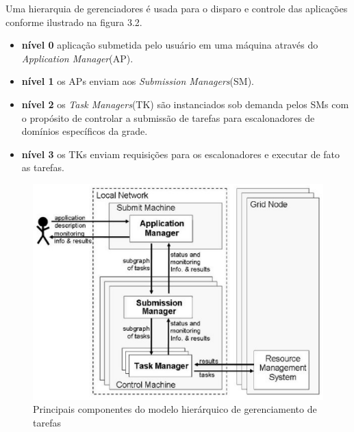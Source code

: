 Uma hierarquia de gerenciadores é usada para o disparo e controle das aplicações conforme ilustrado na figura 3.2.

\begin{itemize}
	\item \textbf{nível 0} aplicação submetida pelo usuário em uma máquina através do \emph{Application Manager}(AP).
	\item \textbf{nível 1} os APs enviam aos \emph{Submission Managers}(SM).
	\item \textbf{nível 2} os \emph{Task Managers}(TK) são instanciados sob demanda pelos SMs com o propósito de controlar a submissão de tarefas para escalonadores de domínios específicos da grade.
	\item \textbf{nível 3} os TKs enviam requisições para os escalonadores e executar de fato as tarefas.
\end{itemize}

\begin{figure}[htb]
\begin{center}
\includegraphics[scale=0.7]{./img/grand.eps}
\caption{Principais componentes do modelo hierárquico de gerenciamento de tarefas}
\label{fig:Modelo_Grand}
\end{center}
\end{figure}
